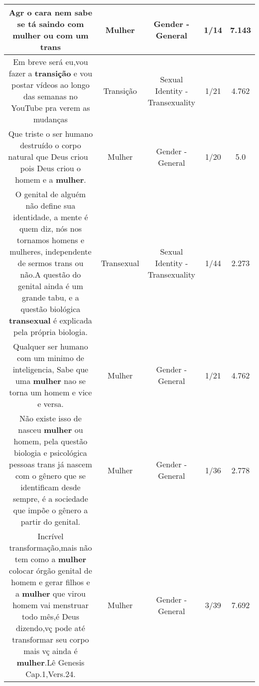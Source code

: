 \documentclass[11pt]{article}
\newlength\mylength
\begin{document}
\begin{center}
\begin{longtable}{|C{.65\mylength}|C{.30\mylength}|C{.12\mylength}|C{.12\mylength}|C{.12\mylength}|}
  \small Agr o cara nem sabe se tá saindo com \textbf{mulher} ou com um trans\normalsize   & Mulher & Gender - General & 1/14 & 7.143 \\  \hline
  \small Em breve será eu,vou fazer a \textbf{transição} e vou postar vídeos ao longo das semanas no YouTube pra verem as mudanças\normalsize   & Transição & Sexual Identity - Transexuality & 1/21 & 4.762 \\  \hline
  \small Que triste o ser humano destruído o corpo natural que Deus criou 🙏pois Deus criou o homem e a \textbf{mulher}.\normalsize   & Mulher & Gender - General & 1/20 & 5.0 \\  \hline
  \small O genital de alguém não define sua identidade, a mente é quem diz, nós nos tornamos homens e mulheres, independente de sermos trans ou não.A questão do genital ainda é um grande tabu, e a questão biológica \textbf{transexual} é explicada pela própria biologia.\normalsize   & Transexual & Sexual Identity - Transexuality & 1/44 & 2.273 \\  \hline
  \small Qualquer ser humano com um minimo de inteligencia, Sabe que uma \textbf{mulher} nao se torna um homem e vice e versa.\normalsize   & Mulher & Gender - General & 1/21 & 4.762 \\  \hline
  \small Não existe isso de nasceu \textbf{mulher} ou homem, pela questão biologia e psicológica pessoas trans já nascem com o gênero que se identificam desde sempre, é a sociedade que impõe o gênero a partir do genital.\normalsize   & Mulher & Gender - General & 1/36 & 2.778 \\  \hline
  \small Incrível transformação,mais não tem como a \textbf{mulher} colocar órgão genital de homem e gerar filhos e a \textbf{mulher} que virou homem vai menstruar todo mês,é Deus dizendo,vç pode até transformar seu corpo mais vç ainda é \textbf{mulher}.Lê Genesis Cap.1,Vers.24.\normalsize   & Mulher & Gender - General & 3/39 & 7.692 \\  \hline

\end{longtable}
\end{center}
\end{document}
